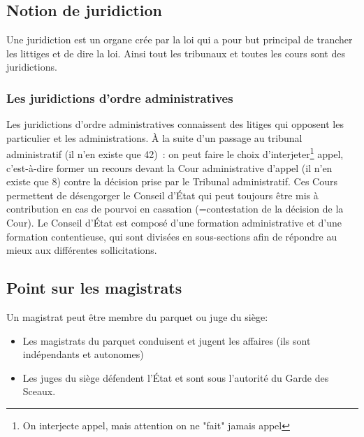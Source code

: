 \documentclass[a4paper]{article}
\begin{document}
			\subsection{Notion de juridiction}
				Une juridiction est un organe crée par la loi qui a pour but principal de trancher les littiges et de dire la loi. Ainsi tout les tribunaux et toutes les cours sont des juridictions.
				\subsubsection{Les juridictions d'ordre administratives}	
					Les juridictions d'ordre administratives connaissent des litiges qui opposent les particulier et les administrations. À la suite d'un passage au tribunal administratif (il n'en existe que 42) : on peut faire le choix d'interjeter\footnote{On interjecte appel, mais attention on ne "fait" jamais appel} appel, c'est-à-dire former un recours devant la Cour administrative d'appel (il n'en existe que 8) contre la décision prise par le Tribunal administratif. Ces Cours permettent de désengorger le Conseil d'État qui peut toujours être mis à contribution en cas de pourvoi en cassation (=contestation de la décision de la Cour). Le Conseil d'État est composé d'une formation administrative et d'une formation contentieuse, qui sont divisées en sous-sections afin de répondre au mieux aux différentes sollicitations.	
			\subsection{Point sur les magistrats}
				Un magistrat peut être membre du parquet ou juge du siège:
				\begin{itemize}
					\item Les magistrats du parquet conduisent et jugent les affaires (ils sont indépendants et autonomes)
					\item Les juges du siège défendent l'État et sont sous l'autorité du Garde des Sceaux.
				\end{itemize}
\end{document}
